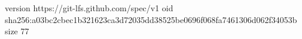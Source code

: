 version https://git-lfs.github.com/spec/v1
oid sha256:a03bc2cbec1b321623ca3d72035dd38525be0696f068fa7461306d062f34053b
size 77
